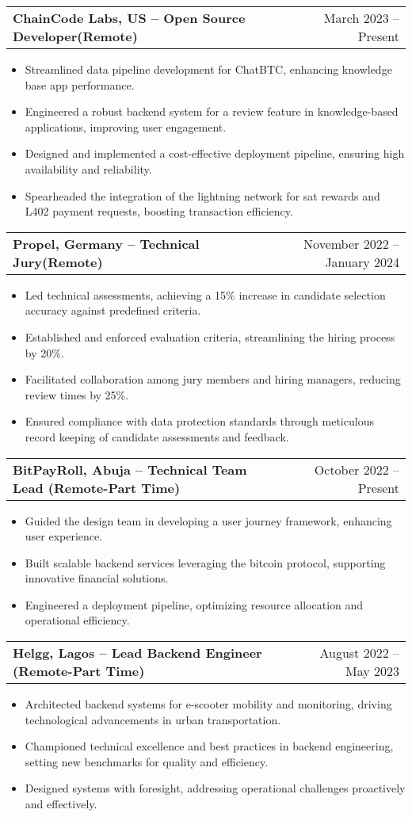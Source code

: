 \documentclass[a4paper,12pt]{article}
\makeatletter
\newenvironment{joblong}[2]
    {
    \begin{tabularx}{\linewidth}{@{}l X r@{}}
    \textbf{#1} & \hfill &  #2 \\[3.75pt]
    \end{tabularx}
    \begin{minipage}[t]{\linewidth}
    \begin{itemize}[nosep,after=\strut, leftmargin=1em, itemsep=3pt,label=--]
    }
    {
    \end{itemize}
    \end{minipage}    
    }
\makeatother
\begin{document}
\begin{joblong}{ChainCode Labs, US -- Open Source Developer(Remote)}{March 2023 -- Present}
\item Streamlined data pipeline development for ChatBTC, enhancing knowledge base app performance.
\item Engineered a robust backend system for a review feature in knowledge-based applications, improving user engagement.
\item Designed and implemented a cost-effective deployment pipeline, ensuring high availability and reliability.
\item Spearheaded the integration of the lightning network for sat rewards and L402 payment requests, boosting transaction efficiency.
\end{joblong}

\begin{joblong}{Propel, Germany -- Technical Jury(Remote)}{November 2022 -- January 2024}
\item Led technical assessments, achieving a 15\% increase in candidate selection accuracy against predefined criteria.
\item Established and enforced evaluation criteria, streamlining the hiring process by 20\%.
\item Facilitated collaboration among jury members and hiring managers, reducing review times by 25\%.
\item Ensured compliance with data protection standards through meticulous record keeping of candidate assessments and feedback.
\end{joblong}

\begin{joblong}{BitPayRoll, Abuja -- Technical Team Lead (Remote-Part Time)}{October 2022 -- Present}
\item Guided the design team in developing a user journey framework, enhancing user experience.
\item Built scalable backend services leveraging the bitcoin protocol, supporting innovative financial solutions.
\item Engineered a deployment pipeline, optimizing resource allocation and operational efficiency.
\end{joblong}

\begin{joblong}{Helgg, Lagos -- Lead Backend Engineer (Remote-Part Time)}{August 2022 -- May 2023}
\item Architected backend systems for e-scooter mobility and monitoring, driving technological advancements in urban transportation.
\item Championed technical excellence and best practices in backend engineering, setting new benchmarks for quality and efficiency.
\item Designed systems with foresight, addressing operational challenges proactively and effectively.
\end{joblong}
\end{document}
